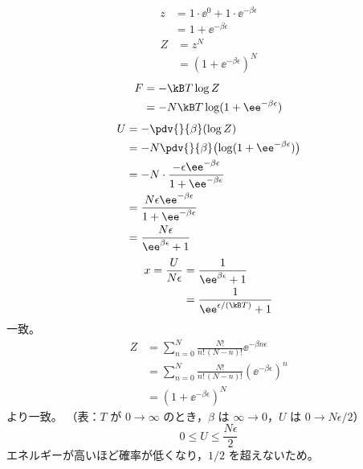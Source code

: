 \begin{align*}
z&=1\cdot\ee^{0}+1\cdot\ee^{-\beta\epsilon}\\
&=1+\ee^{-\beta\epsilon}
\end{align*}
\begin{align*}
Z&=z^{N}\\
&=(1+\ee^{-\beta\epsilon})^{N}
\end{align*}
\begin{align*}
F&=-\kB T\log Z\\
&=-N\kB T\log(1+\ee^{-\beta\epsilon})
\end{align*}
\begin{align*}
U&=-\pdv{}{\beta}(\log Z)\\
&=-N\pdv{}{\beta}\bigl(\log(1+\ee^{-\beta\epsilon})\bigr)\\
&=-N\cdot\frac{-\epsilon\ee^{-\beta\epsilon}}{1+\ee^{-\beta\epsilon}}\\
&=\frac{N\epsilon\ee^{-\beta\epsilon}}{1+\ee^{-\beta\epsilon}}\\
&=\frac{N\epsilon}{\ee^{\beta\epsilon}+1}
\end{align*}
\begin{align*}
x=\frac{U}{N\epsilon}&=\frac{1}{\ee^{\beta\epsilon}+1}\\
&=\frac{1}{\ee^{\epsilon/(\kB T)}+1}
\end{align*}
一致。
\begin{align*}
Z&=\sum_{n=0}^{N}\frac{N!}{n!\,(N-n)!}\ee^{-\beta n\epsilon}\\
&=\sum_{n=0}^{N}\frac{N!}{n!\,(N-n)!}(\ee^{-\beta\epsilon})^{n}\\
&=(1+\ee^{-\beta\epsilon})^{N}
\end{align*}
より一致。
（表：$T$ が $0\to\infty$ のとき，$\beta$ は $\infty\to0$，$U$ は $0\to N\epsilon/2$）
\[ 0\le U\le\frac{N\epsilon}{2} \]
エネルギーが高いほど確率が低くなり，$1/2$ を超えないため。
